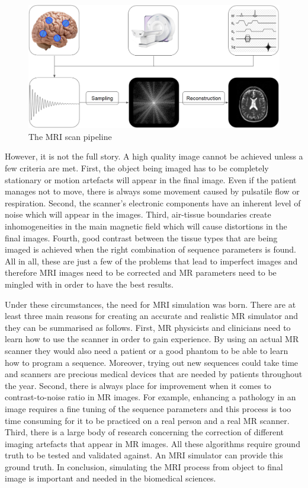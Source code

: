 \begin{figure}[H]
    \centering
    \includegraphics[width=1\textwidth,keepaspectratio]{mriscan}
    \caption{The MRI scan pipeline}
    \label{fig:mriscan}
\end{figure}

However, it is not the full story. A high quality image cannot be achieved unless a few criteria are met. First, the object being imaged has to be completely stationary or motion artefacts will appear in the final image. Even if the patient manages not to move, there is always some movement caused by pulsatile flow or respiration. Second, the scanner's electronic components have an inherent level of noise which will appear in the images. Third, air-tissue boundaries create inhomogeneities in the main magnetic field which will cause distortions in the final images. Fourth, good contrast between the tissue types that are being imaged is achieved when the right combination of sequence parameters is found. All in all, these are just a few of the problems that lead to imperfect images and therefore MRI images need to be corrected and MR parameters need to be mingled with in order to have the best results. 

Under these circumstances, 
the need for MRI simulation was born. There are at least three main reasons for creating an accurate and realistic MR simulator and they can be summarised as follows. First, MR physicists and clinicians need to learn how to use the scanner in order to gain experience. By using an actual MR scanner they would also need a patient or a good phantom to be able to learn how to program a sequence. Moreover, trying out new sequences could take time and scanners are precious medical devices that are needed by patients throughout the year. Second, there is always place for improvement when it comes to contrast-to-noise ratio in MR images. For example, enhancing a pathology in an image requires a fine tuning of the sequence parameters and this process is too time consuming for it to be practiced on a real person and a real MR scanner. Third, there is a large body of research concerning the correction of different imaging artefacts that appear in MR images. All these algorithms require ground truth to be tested and validated against. An MRI simulator can provide this ground truth. In conclusion, simulating the MRI process from object to final image is important and needed in the biomedical sciences.

